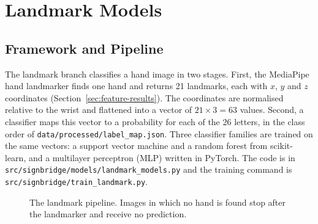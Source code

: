 \section{Landmark Models}
\label{sec:landmark-models}

\subsection{Framework and Pipeline}

The landmark branch classifies a hand image in two stages. First, the MediaPipe hand landmarker finds one hand and returns 21 landmarks, each with $x$, $y$ and $z$ coordinates (Section~\ref{sec:feature-results}). The coordinates are normalised relative to the wrist and flattened into a vector of $21\times3=63$ values. Second, a classifier maps this vector to a probability for each of the 26 letters, in the class order of \texttt{data/processed/label\_map.json}. Three classifier families are trained on the same vectors: a support vector machine and a random forest from scikit-learn, and a multilayer perceptron (MLP) written in PyTorch. The code is in \texttt{src/signbridge/models/landmark\_models.py} and the training command is \texttt{src/signbridge/train\_landmark.py}.

\begin{figure}[htbp]
\centering
{}
\caption{The landmark pipeline. Images in which no hand is found stop after the landmarker and receive no prediction.}
\label{fig:landmark-pipeline}
\end{figure}

